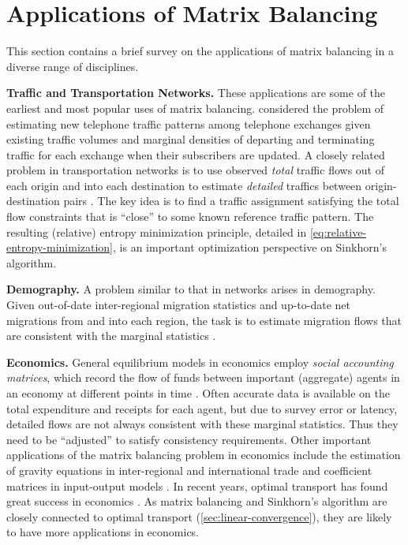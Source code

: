 \section{Applications of Matrix Balancing}
\label{app:related-works}
This section contains a brief survey on the applications of matrix balancing in a diverse range of disciplines.

\textbf{Traffic and Transportation Networks.} These applications are some of the earliest and most popular uses of matrix balancing. \citet{kruithof1937telefoonverkeersrekening} considered the problem of estimating new telephone traffic patterns among telephone exchanges given existing traffic volumes and marginal densities of departing and terminating traffic for each exchange when their subscribers are updated. A closely related problem in transportation networks is to use observed \emph{total} traffic flows out of each origin and into each destination to estimate \emph{detailed} traffics between origin-destination pairs \citep{carey1981method,nguyen1984estimating,sheffi1985urban,chang2021mobility}. The key idea is to find a traffic assignment satisfying the total flow constraints that is ``close'' to some known reference traffic pattern. The resulting (relative) entropy minimization principle, detailed in \eqref{eq:relative-entropy-minimization}, is an important optimization perspective on Sinkhorn's algorithm.

\textbf{Demography.} A problem similar to that in networks arises in demography. Given out-of-date inter-regional migration statistics and up-to-date net migrations from and into each region, the task is to estimate migration flows that are consistent with the marginal statistics \citep{plane1982information}.

\textbf{Economics.}
General equilibrium models in economics employ \emph{social accounting matrices}, which record the flow of funds between important (aggregate) agents in an economy at different points in time \citep{stone1962multiple,pyatt1985social}. Often accurate data is available on the total expenditure and receipts for each agent, but due to survey error or latency, detailed flows are not always consistent with these marginal statistics. Thus they need to be ``adjusted'' to satisfy consistency requirements.  Other important applications of the matrix balancing problem in economics include the estimation of gravity equations in inter-regional and international trade \citep{uribe1966information,wilson1969use,anderson2003gravity,silva2006log} and coefficient matrices in input-output models \citep{leontief1965structure,stone1971computable,bacharach1970biproportional}. In recent years, optimal transport \citep{villani2009optimal} has found great success in economics \citep{carlier2016vector,galichon2018optimal,galichon2021unreasonable,galichon2021matching}. As matrix balancing and Sinkhorn's algorithm are closely connected to optimal transport (\cref{sec:linear-convergence}), they are likely to have more applications in economics.

